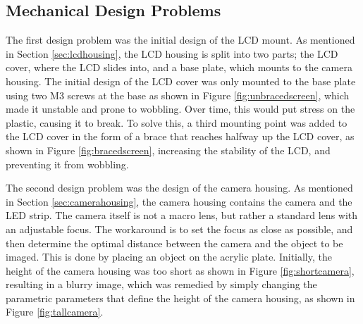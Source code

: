 \noindent
\subsection{Mechanical Design Problems}
The first design problem was the initial design of the LCD mount. As mentioned in Section \ref{sec:lcdhousing},
the LCD housing is split into two parts; the LCD cover, where the LCD slides into, and a base plate, which mounts to the camera housing.
The initial design of the LCD cover was only mounted to the base plate using two M3 screws at the base as shown in Figure \ref{fig:unbracedscreen}, which made it unstable and prone to wobbling.
Over time, this would put stress on the plastic, causing it to break. To solve this, a third mounting point was added to the LCD cover in the form of a 
brace that reaches halfway up the LCD cover, as shown in Figure \ref{fig:bracedscreen}, increasing the stability of the LCD, and preventing it from wobbling.

The second design problem was the design of the camera housing. As mentioned in Section \ref{sec:camerahousing}, the camera housing contains the camera and the LED strip.
The camera itself is not a macro lens, but rather a standard lens with an adjustable focus. The workaround is to set the focus as close as possible, and then determine the optimal
distance between the camera and the object to be imaged. This is done by placing an object on the acrylic plate. Initially, the height of the camera housing was too short as shown in Figure \ref{fig:shortcamera}, resulting in a 
blurry image, which was remedied by simply changing the parametric parameters that define the height of the camera housing, as shown in Figure \ref{fig:tallcamera}. 

